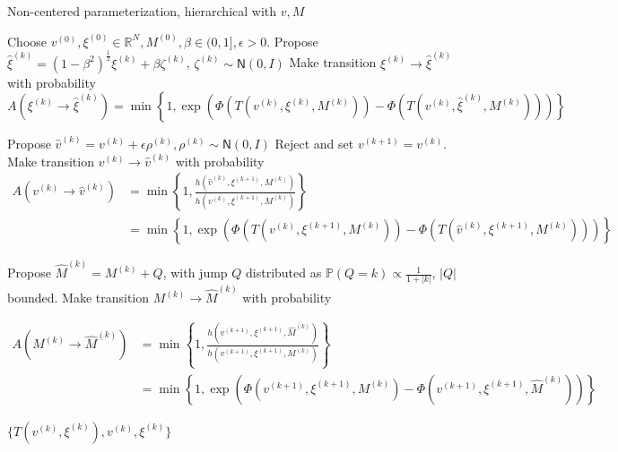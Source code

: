 \documentclass{siamart1116}
\begin{document}
        \begin{algorithm}
        \caption{Non-centered parameterization, hierarchical with $v, M$}
        \label{alg:hier_v_M}
        \begin{algorithmic}[1]
        \State Choose $v^{(0)}, \xi^{(0)} \in \mathbb{R}^N, M^{(0)}, \beta \in (0, 1], \epsilon > 0$.
        \State Propose $\hat\xi^{(k)} = (1-\beta^2)^{\frac{1}{2}}\xi^{(k)} + \beta \zeta^{(k)}$, $\zeta^{(k)} \sim \mathsf{N}(0, I)$
        \State Make transition $\xi^{(k)} \to \hat\xi^{(k)}$ with probability
        \[ A(\xi^{(k)} \to \hat\xi^{(k)}) = \min\left\{1, \exp\left(\Phi(T(v^{(k)}, \xi^{(k)}, M^{(k)})) - \Phi(T(v^{(k)}, \hat \xi^{(k)}, M^{(k)}))\right) \right\}\]

        \State Propose $\hat v^{(k)} = v^{(k)} + \epsilon \rho^{(k)}, \rho^{(k)} \sim \mathsf{N}(0,I)$
            \State Reject and set $v^{(k+1)} = v^{(k)}$.
        \Else
        \State Make transition $v^{(k)} \to \hat v^{(k)}$ with probability
        \begin{align*}
         A(v^{(k)} \to \hat v^{(k)}) &= \min\left\{1, \frac{h(\hat v^{(k)}, \xi^{(k+1)}, M^{(k)})}{h(v^{(k)}, \xi^{(k+1)}, M^{(k)})}\right\} \\
         &= \min\left\{1, \exp\left(\Phi(T(v^{(k)}, \xi^{(k+1)},M^{(k)}))-\Phi(T(\hat v^{(k)}, \xi^{(k+1)}, M^{(k)})) \right) \right\}
         \end{align*}
        \EndIf

        \State Propose $\hat M^{(k)} = M^{(k)} + Q$, with jump $Q$ distributed as $\mathbb{P}(Q=k) \propto \frac{1}{1+|k|}$, $|Q|$ bounded.
        \State Make transition $M^{(k)} \to \hat M^{(k)}$ with probability

        \begin{align*}
        A(M^{(k)} \to \hat M^{(k)}) &= \min\left\{1, \frac{h( v^{(k+1)}, \xi^{(k+1)}, \hat M^{(k)}  )}{h( v^{(k+1)}, \xi^{(k+1)}, M^{(k)} )} \right\}\\
        &=\min\left\{1, \exp\left(\Phi(v^{(k+1)}, \xi^{(k+1)}, M^{(k)} ) - \Phi(v^{(k+1)}, \xi^{(k+1)}, \hat M^{(k)} )\right)\right\}
        \end{align*}

        \EndFor
        \State \Return $\{ T(v^{(k)},\xi^{(k)}), v^{(k)}, \xi^{(k)} \}$
        \end{algorithmic}
        \end{algorithm}
\end{document}
